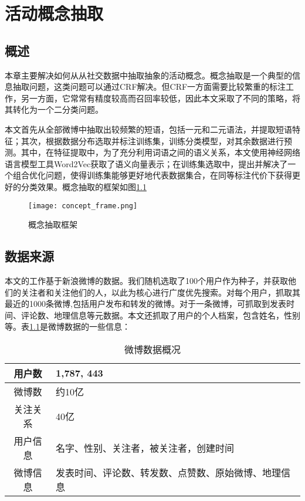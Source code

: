 
\chapter{活动概念抽取}

\section{概述}
本章主要解决如何从从社交数据中抽取抽象的活动概念。概念抽取是一个典型的信息抽取问题，这类问题可以通过CRF解决。但CRF一方面需要比较繁重的标注工作，另一方面，它常常有精度较高而召回率较低，因此本文采取了不同的策略，将其转化为一个二分类问题。

本文首先从全部微博中抽取出较频繁的短语，包括一元和二元语法，并提取短语特征；其次，根据数据分布选取并标注训练集，训练分类模型，对其余数据进行预测。其中，在特征提取中，为了充分利用词语之间的语义关系，本文使用神经网络语言模型工具Word2Vec获取了语义向量表示；在训练集选取中，提出并解决了一个组合优化问题，使得训练集能够更好地代表数据集合，在同等标注代价下获得更好的分类效果。概念抽取的框架如图\ref{fig:concept_frame}

\begin{figure}[!h]
\centering
\texttt{[image: concept\_frame.png]}
\caption{概念抽取框架}
\label{fig:concept_frame}
\end{figure}
\label{chp:concept}

\section{数据来源}
本文的工作基于新浪微博的数据。我们随机选取了100个用户作为种子，并获取他们的关注者和关注他们的人，以此为核心进行广度优先搜索。对每个用户，抓取其最近的1000条微博,包括用户发布和转发的微博。对于一条微博，可抓取到发表时间、评论数、地理信息等元数据。本文还抓取了用户的个人档案，包含姓名，性别等。表\ref{table:weibo_stat}是微博数据的一些信息：
\begin{table}[!h]
\centering
\begin{tabular}{|c|p{8cm}|}
\hline
用户数 & 1,787, 443 \\
\hline
微博数 & 约10亿 \\
\hline 
关注关系 & 40亿 \\
\hline 
用户信息 & 名字、性别、关注者，被关注者，创建时间 \\
\hline
微博信息 & 发表时间、评论数、转发数、点赞数、原始微博、地理信息 \\
\hline
\end{tabular}
\caption{微博数据概况}
\label{table:weibo_stat}
\end{table}

